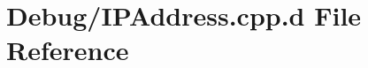 \hypertarget{_debug_2_i_p_address_8cpp_8d}{\section{\-Debug/\-I\-P\-Address.cpp.\-d \-File \-Reference}
\label{_debug_2_i_p_address_8cpp_8d}
}
